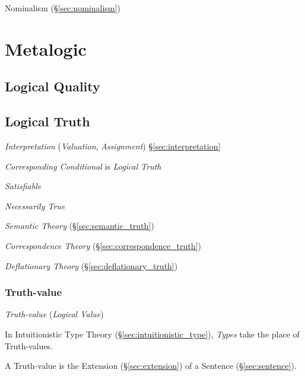 Nominalism (\S\ref{sec:nominalism})



\section{Metalogic}\label{sec:metalogic}

\subsection{Logical Quality}\label{sec:logical_quality}

\subsection{Logical Truth}\label{sec:logical_truth}

\emph{Interpretation} (\emph{Valuation}, \emph{Assignment})
\S\ref{sec:interpretation}

\emph{Corresponding Conditional} is \emph{Logical Truth}

\emph{Satisfiable}

\emph{Necessarily True}

\emph{Semantic Theory} (\S\ref{sec:semantic_truth})

\emph{Correspondence Theory} (\S\ref{sec:correspondence_truth})

\emph{Deflationary Theory} (\S\ref{sec:deflationary_truth})



\subsubsection{Truth-value}\label{sec:truth_value}

\emph{Truth-value} (\emph{Logical Value})

In Intuitionistic Type Theory (\S\ref{sec:intuitionistic_type}),
\emph{Types} take the place of Truth-values.

A Truth-value is the Extension (\S\ref{sec:extension}) of a Sentence
(\S\ref{sec:sentence}).



